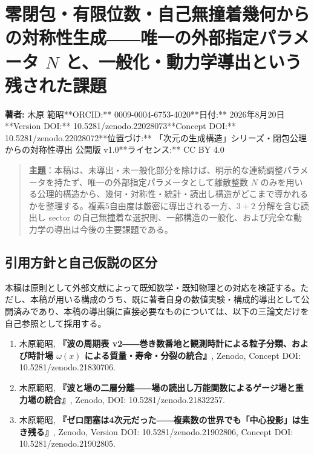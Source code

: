 \documentclass[
  a4paper,
]{ltjsarticle}
\author{}
\date{}
\providecommand{\tightlist}{%
  \setlength{\itemsep}{0pt}\setlength{\parskip}{0pt}}
\begin{document}
\section{\texorpdfstring{零閉包・有限位数・自己無撞着幾何からの対称性生成――唯一の外部指定パラメータ
\(N\)
と、一般化・動力学導出という残された課題}{零閉包・有限位数・自己無撞着幾何からの対称性生成――唯一の外部指定パラメータ N と、一般化・動力学導出という残された課題}}\label{ux96f6ux9589ux5305ux6709ux9650ux4f4dux6570ux81eaux5df1ux7121ux649eux7740ux5e7eux4f55ux304bux3089ux306eux5bfeux79f0ux6027ux751fux6210ux552fux4e00ux306eux5916ux90e8ux6307ux5b9aux30d1ux30e9ux30e1ux30fcux30bf-n-ux3068ux4e00ux822cux5316ux52d5ux529bux5b66ux5c0eux51faux3068ux3044ux3046ux6b8bux3055ux308cux305fux8ab2ux984c}

\textbf{著者:} 木原 範昭**ORCID:** 0009-0004-6753-4020**日付:**
2026年8月20日**Version DOI:** 10.5281/zenodo.22028073**Concept DOI:**
10.5281/zenodo.22028072**位置づけ:**
「次元の生成構造」シリーズ・閉包公理からの対称性導出 公開版
v1.0**ライセンス:** CC BY 4.0

\begin{quote}
\textbf{主題}：本稿は、未導出・未一般化部分を除けば、明示的な連続調整パラメータを持たず、唯一の外部指定パラメータとして離散整数
\(N\)
のみを用いる公理的構造から、幾何・対称性・統計・読出し構造がどこまで導かれるかを整理する。複素5自由度は厳密に導出される一方、\(3+2\)
分解を含む読出し sector
の自己無撞着な選択則、一部構造の一般化、および完全な動力学の導出は今後の主要課題である。
\end{quote}

\subsection{引用方針と自己仮説の区分}\label{ux5f15ux7528ux65b9ux91ddux3068ux81eaux5df1ux4eeeux8aacux306eux533aux5206}

本稿は原則として外部文献によって既知数学・既知物理との対応を検証する。ただし、本稿が用いる構成のうち、既に著者自身の数値実験・構成的導出として公開済みであり、本稿の導出鎖に直接必要なものについては、以下の三論文だけを自己参照として採用する。

\begin{enumerate}
\def\labelenumi{\arabic{enumi}.}
\tightlist
\item
  木原範昭, \textbf{『波の周期表
  v2――巻き数番地と観測時計による粒子分類、および時計場 \(\omega(x)\)
  による質量・寿命・分裂の統合』}, Zenodo, Concept DOI:
  10.5281/zenodo.21830706.
\item
  木原範昭,
  \textbf{『波と場の二層分離――場の読出し万能関数によるゲージ場と重力場の統合』},
  Zenodo, DOI: 10.5281/zenodo.21832257.
\item
  木原範昭,
  \textbf{『ゼロ閉塞は4次元だった――複素数の世界でも「中心投影」は生き残る』},
  Zenodo, Version DOI: 10.5281/zenodo.21902806, Concept DOI:
  10.5281/zenodo.21902805.
\end{enumerate}
\end{document}
